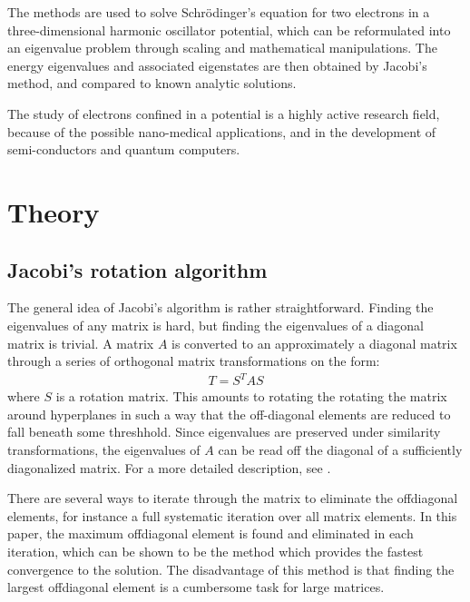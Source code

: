\documentclass[aps,reprint]{revtex4-1}
\begin{document}
The methods are used to solve Schrödinger's equation for two electrons in a
three-dimensional harmonic oscillator potential, which can be reformulated into
an eigenvalue problem through scaling and mathematical manipulations. The
energy eigenvalues and associated eigenstates are then obtained by Jacobi's method,
and compared to known analytic solutions.

The study of electrons confined in a potential is a highly active research field,
because of the possible nano-medical applications, and in the development of semi-conductors
and quantum computers.
\section{Theory}
\label{sec:theory}
\subsection{Jacobi's rotation algorithm}
The general idea of Jacobi's algorithm is rather straightforward. Finding the
eigenvalues of any matrix is hard, but finding the eigenvalues of a diagonal
matrix is trivial. A matrix \(A\) is converted to an approximately a diagonal
matrix through a series of orthogonal matrix transformations on the form:
\begin{align*}
  T = S^T A S
\end{align*}
where $S$ is a rotation matrix. This amounts to rotating the rotating the matrix
around hyperplanes in such a way that the off-diagonal elements are reduced to
fall beneath some threshhold.
Since eigenvalues are preserved under similarity
transformations, the eigenvalues of \(A\) can be read off the diagonal of a
sufficiently diagonalized matrix. For a more detailed description, see \cite{mortenjensen}.

There are several ways to iterate through the matrix to eliminate the offdiagonal
elements, for instance a full systematic iteration over all matrix elements. In this paper,
the maximum offdiagonal element is found and eliminated in each iteration, which can be shown to be
the method which provides the fastest convergence to the solution. The disadvantage of this method
is that finding the largest offdiagonal element is a cumbersome task for large matrices.
\end{document}
